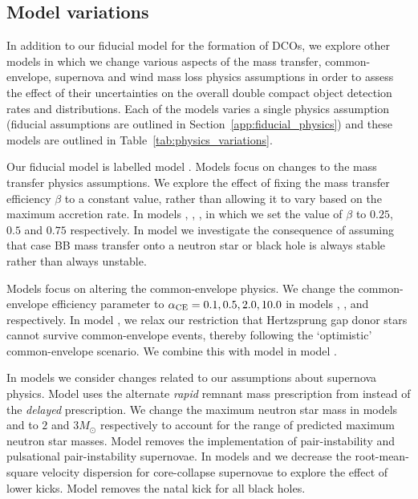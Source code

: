 \subsection{Model variations} \label{sec:variation_assumptions}
In addition to our fiducial model for the formation of DCOs, we explore \nMinusOneModels{} other models in which we change various aspects of the mass transfer, common-envelope, supernova and wind mass loss physics assumptions in order to assess the effect of their uncertainties on the overall double compact object detection rates and distributions. Each of the models varies a single physics assumption (fiducial assumptions are outlined in Section~\ref{app:fiducial_physics}) and these models are outlined in Table~\ref{tab:physics_variations}.

Our fiducial model is labelled model \modFid{}. Models \modRangeMT{} focus on changes to the mass transfer physics assumptions. We explore the effect of fixing the mass transfer efficiency $\beta$ to a constant value, rather than allowing it to vary based on the maximum accretion rate. In models \modBetaLow{}, \modBetaMed{}, \modBetaHigh{}, in which we set the value of $\beta$ to $0.25$, $0.5$ and $0.75$ respectively. In model \modCaseBB{} we investigate the consequence of assuming that case BB mass transfer onto a neutron star or black hole is always stable rather than always unstable.

Models \modRangeCE{} focus on altering the common-envelope physics. We change the common-envelope efficiency parameter to $\alpha_{\rm CE} = 0.1, 0.5, 2.0, 10.0$ in models \modAlphaLowest{}, \modAlphaLow{}, \modAlphaHigh{} and \modAlphaHighest{} respectively. In model \modOpt{}, we relax our restriction that Hertzsprung gap donor stars cannot survive common-envelope events, thereby following the `optimistic' common-envelope scenario. We combine this with model \modCaseBB{} in model \modCaseBBOpt{}.

In models \modRangeSN{} we consider changes related to our assumptions about supernova physics. Model \modRapid{} uses the alternate \textit{rapid} remnant mass prescription from \citet{Fryer+2012} instead of the \textit{delayed} prescription. We change the maximum neutron star mass in models \modNSLow{} and \modNSHigh{} to $2$ and $3 \unit{M_{\odot}}$ respectively to account for the range of predicted maximum neutron star masses. Model \modNoPISN{} removes the implementation of pair-instability and pulsational pair-instability supernovae. In models \modSigLow{} and \modSigLower{} we decrease the root-mean-square velocity dispersion for core-collapse supernovae to explore the effect of lower kicks. Model \modNoBH{} removes the natal kick for all black holes.

